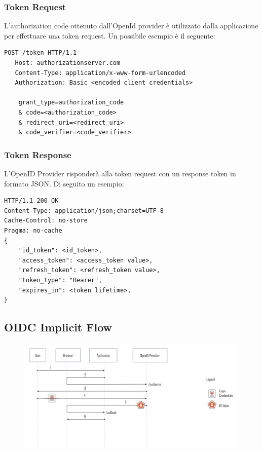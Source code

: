 \subsubsection{Token Request}

L'authorization code ottenuto dall'OpenId provider è utilizzato dalla applicazione
per effettuare una token request. Un possibile esempio è il seguente:

\begin{lstlisting}
POST /token HTTP/1.1
   Host: authorizationserver.com
   Content-Type: application/x-www-form-urlencoded
   Authorization: Basic <encoded client credentials>

    grant_type=authorization_code
    & code=<authorization_code>
    & redirect_uri=<redirect_uri>
    & code_verifier=<code_verifier>
\end{lstlisting}

\subsubsection{Token Response}

L'OpenID Provider risponderà alla token request con un response token in formato
JSON. Di seguito un esempio:

\begin{lstlisting}
HTTP/1.1 200 OK
Content-Type: application/json;charset=UTF-8
Cache-Control: no-store
Pragma: no-cache
{
    "id_token": <id_token>,
    "access_token": <access_token value>,
    "refresh_token": <refresh_token value>,
    "token_type": "Bearer",
    "expires_in": <token lifetime>,
}
\end{lstlisting}

\subsection{OIDC Implicit Flow}

\begin{figure}[H]
    \centering
    \includegraphics[width=\textwidth, keepaspectratio]{capitoli/id_managing/imgs/implicitflow.png}
\end{figure}

